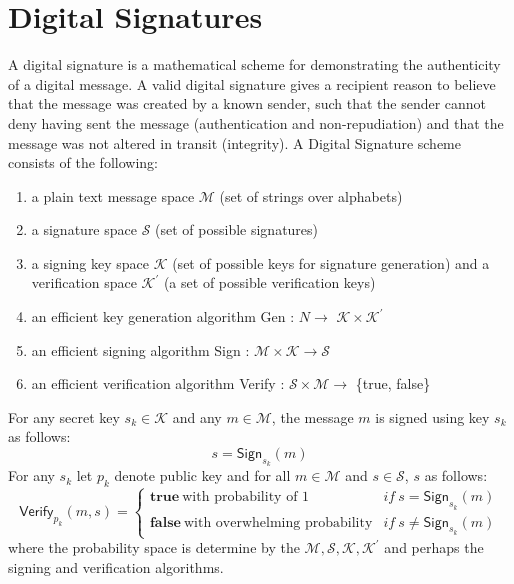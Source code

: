 \section{Digital Signatures}
	\label{sec:digital-signature}
	A digital signature is a mathematical scheme for demonstrating the authenticity of a digital message. 
	A valid digital signature gives a recipient reason to believe that the message was created by a known sender, such that the sender cannot deny having sent the message (authentication and non-repudiation) and that the message was not altered in transit (integrity).
	A Digital Signature scheme consists of the following:
	\begin{enumerate}
		\item a plain text message space $\mathcal{M}$ (set of strings over alphabets)
		\item a signature space $\mathcal{S}$ (set of possible signatures)
		\item a signing key space $\mathcal{K}$ (set of possible keys for signature generation) and a verification space $\mathcal{K^{'}}$ (a set of possible verification keys)
		\item an efficient key generation algorithm \textsf{Gen} : $N \rightarrow$ $\mathcal{K} \times \mathcal{K^{'}} $ 
		\item an efficient signing algorithm \textsf{Sign} : $ \mathcal{M} \times \mathcal{K} \rightarrow \mathcal{S}$
		\item an efficient verification algorithm \textsf{Verify} : $\mathcal{S} \times \mathcal{M} \rightarrow$ \{true, false\} 
	\end{enumerate}
	For any secret key $s_{k} \in \mathcal{K}$ and any $m \in \mathcal{M}$,	the message $m$ is signed using key $s_{k}$ as follows:
		\begin{equation}
			s = \textsf{Sign}_{s_{k}}(m)
			\label{eq:signature}
		\end{equation}
	For any $s_{k}$ let $p_{k}$ denote public key and for all $m \in \mathcal{M}$ and $s \in \mathcal{S}$, $s$ as follows:
	\begin{equation}
		\textsf{Verify}_{p_{k}}(m,s) = 
		\begin{cases}
		 \textbf{true}\ \mbox{with probability of 1} & if\ s = \textsf{Sign}_{s_{k}}(m)\\
		 \textbf{false}\ \mbox{with overwhelming probability} & if\ s \neq \textsf{Sign}_{s_{k}}(m)
		\end{cases}
		\label{eq:verification}
	\end{equation}
	where the probability space is determine by the $\mathcal {M, S, K, K^{'}}$ and perhaps the signing and verification algorithms.
